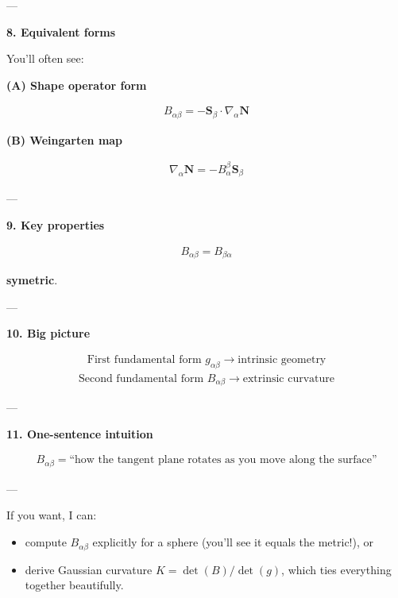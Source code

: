 \documentclass[12pt,a4paper]{report}
\begin{document}
\begin{description}
\begin{description}
\begin{description}
---

\item \textbf{8. Equivalent forms}

You’ll often see:

\textbf{(A) Shape operator form}

\begin{align*}
B_{\alpha\beta} = - \mathbf{S}_\beta \cdot \nabla_\alpha \mathbf{N}
\end{align*}
  

\textbf{ (B) Weingarten map}

\begin{align*}
\nabla_\alpha \mathbf{N} = -B_\alpha^{\beta} \mathbf{S}_\beta
\end{align*}

---

\item \textbf{9. Key properties}

\begin{align*}
\boxed{
B_{\alpha\beta} = B_{\beta\alpha}
}
\end{align*}

\textbf{symetric}.

---

\item \textbf{10. Big picture}

\begin{align*}
\boxed{
\text{First fundamental form } g_{\alpha\beta} \rightarrow \text{intrinsic geometry}
}
\end{align*}
\begin{align*}
\boxed{
\text{Second fundamental form } B_{\alpha\beta} \rightarrow \text{extrinsic curvature}
}
\end{align*}

---

\item \textbf{11. One-sentence intuition}

\begin{align*}
\boxed{
B_{\alpha\beta} = \text{“how the tangent plane rotates as you move along the surface”}
}
\end{align*}

---
\end{description}

If you want, I can:

\begin{itemize}
\item compute $B_{\alpha\beta}$ explicitly for a sphere (you’ll see it equals the metric!), or
\item derive Gaussian curvature $K = \det(B)/\det(g)$, which ties everything together beautifully.
\end{itemize}



\end{description}
\end{description}
\end{document}
